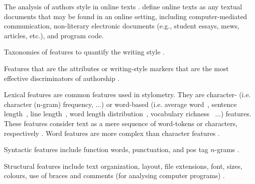 \begin{definition}
    The analysis of authors style in online texts \cite{abbasi_writeprints_2008}.
    \citet{abbasi_writeprints_2008} define online texts as any textual documents that may be found in an online setting, 
    including computer-mediated communication, non-literary electronic documents (e.g., student essays, mews, articles, etc.), and program code.
\end{definition}

\begin{definition}
    Taxonomies of features to quantify the writing style \cite{stamatatos_survey_2009}.
\end{definition}

\begin{definition}
    Features that are the attributes or writing-style markers that are the most effective discriminators of authorship \cite{abbasi_writeprints_2008}.
\end{definition}

\begin{definition}
    Lexical features are common features used in stylometry.
    They are character- (i.e. character (n-gram) frequency, ...) 
    or word-based (i.e. average word~\cite{stein_intrinsic_2011}, sentence length~\cite{stein_intrinsic_2011,abbasi_writeprints_2008}, 
    line length~\cite{abbasi_writeprints_2008}, word length distribution~\cite{abbasi_writeprints_2008}, 
    vocabulary richness~\cite{abbasi_writeprints_2008} ...) features. 
    These features consider text as a mere sequence of word-tokens or characters, respectively \cite{stamatatos_survey_2009}.
    Word features are more complex than character features \cite{stamatatos_survey_2009}.
\end{definition}

\begin{definition}
    Syntactic features include function words, punctuation, and \ac{pos} tag $n$-grams \cite{abbasi_writeprints_2008}.
\end{definition}

\begin{definition}
    Structural features include text organization, layout, file extensions, font, sizes, colours, 
    use of braces and comments (for analysing computer programs) \cite{abbasi_writeprints_2008}.
\end{definition}

